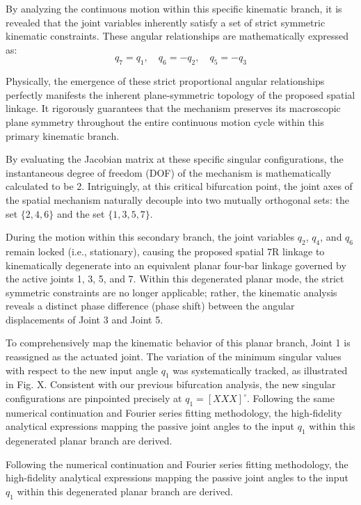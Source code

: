 \documentclass[a4paper,fleqn]{cas-sc}
\begin{document}
By analyzing the continuous motion within this specific kinematic branch, it is revealed that the joint variables inherently satisfy a set of strict symmetric kinematic constraints. These angular relationships are mathematically expressed as:
\begin{equation}
    q_7 = q_1, \quad q_6 = -q_2, \quad q_5 = -q_3
\end{equation}

Physically, the emergence of these strict proportional angular relationships perfectly manifests the inherent plane-symmetric topology of the proposed spatial linkage. It rigorously guarantees that the mechanism preserves its macroscopic plane symmetry throughout the entire continuous motion cycle within this primary kinematic branch.

By evaluating the Jacobian matrix at these specific singular configurations, the instantaneous degree of freedom (DOF) of the mechanism is mathematically calculated to be 2. Intriguingly, at this critical bifurcation point, the joint axes of the spatial mechanism naturally decouple into two mutually orthogonal sets: the set $\{2, 4, 6\}$ and the set $\{1, 3, 5, 7\}$. 

During the motion within this secondary branch, the joint variables $q_2$, $q_4$, and $q_6$ remain locked (i.e., stationary), causing the proposed spatial 7R linkage to kinematically degenerate into an equivalent planar four-bar linkage governed by the active joints 1, 3, 5, and 7. Within this degenerated planar mode, the strict symmetric constraints are no longer applicable; rather, the kinematic analysis reveals a distinct phase difference (phase shift) between the angular displacements of Joint 3 and Joint 5.

To comprehensively map the kinematic behavior of this planar branch, Joint 1 is reassigned as the actuated joint. The variation of the minimum singular values with respect to the new input angle $q_1$ was systematically tracked, as illustrated in Fig. X. Consistent with our previous bifurcation analysis, the new singular configurations are pinpointed precisely at $q_1 = [XXX]^\circ$. Following the same numerical continuation and Fourier series fitting methodology, the high-fidelity analytical expressions mapping the passive joint angles to the input $q_1$ within this degenerated planar branch are derived.

Following the numerical continuation and Fourier series fitting methodology, the high-fidelity analytical expressions mapping the passive joint angles to the input $q_1$ within this degenerated planar branch are derived. 
\end{document}
